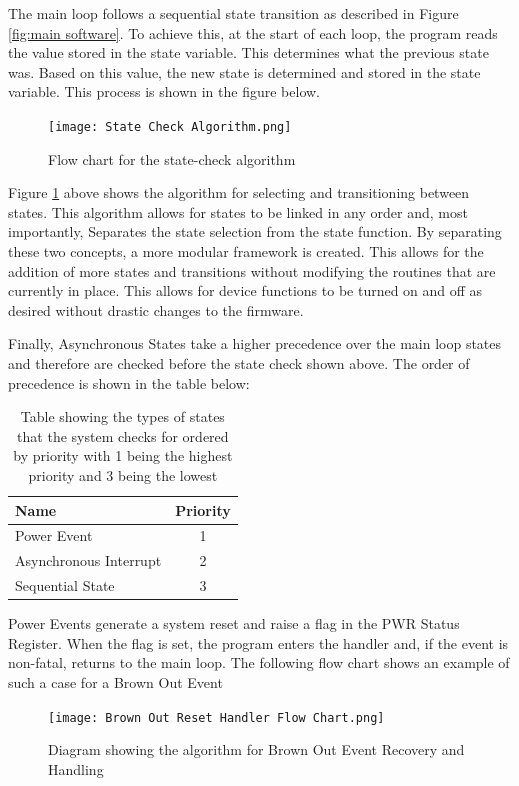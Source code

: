 The main loop follows a sequential state transition as described in Figure \ref{fig:main software}. To achieve this, at the start of each loop, the program reads the value stored in the state variable. This determines what the previous state was. Based on this value, the new state is determined and stored in the state variable. This process is shown in the figure below.

\begin{figure}[H]
	\centering
	\texttt{[image: State Check Algorithm.png]}
	\caption{Flow chart for the state-check algorithm}
	\label{fig:state_check}
\end{figure}

Figure \ref{fig:state_check} above shows the algorithm for selecting and transitioning between states. This algorithm allows for states to be linked in any order and, most importantly, Separates the state selection from the state function. By separating these two concepts, a more modular framework is created. This allows for the addition of more states and transitions without modifying the routines that are currently in place. This allows for device functions to be turned on and off as desired without drastic changes to the firmware.

Finally, Asynchronous States take a higher precedence over the main loop states and therefore are checked before the state check shown above. The order of precedence is shown in the table below:
\begin{table}[H]
	\centering
	\caption{Table showing the types of states that the system checks for ordered by priority with 1 being the highest priority and 3 being the lowest}
	\begin{tabular}{|l|c|}
		\hline
		Name & Priority \\
		\hline
		Power Event & 1 \\
		\hline
		Asynchronous Interrupt & 2 \\
		\hline
		Sequential State & 3 \\
		\hline
	\end{tabular}
	
	\label{tab:state_prio}
\end{table}

Power Events generate a system reset and raise a flag in the PWR Status Register. When the flag is set, the program enters the handler and, if the event is non-fatal, returns to the main loop. The following flow chart shows an example of such a case for a Brown Out Event

\begin{figure}[H]
	\centering
	\texttt{[image: Brown Out Reset Handler Flow Chart.png]}
	\caption{Diagram showing the algorithm for Brown Out Event Recovery and Handling}
	\label{fig:evt_handle}
\end{figure}

